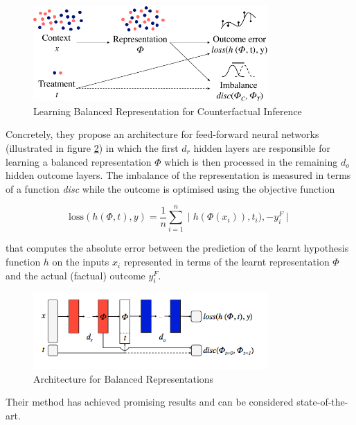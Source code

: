 \begin{figure}[h]
	\centering
	\includegraphics[width=0.8\textwidth]{figures/chapter-2/balanced-representations.png}
	\caption{Learning Balanced Representation for Counterfactual Inference}\label{fig:balanced-representations}
\end{figure}

Concretely, they propose an architecture for feed-forward neural networks (illustrated in figure \ref{fig:balanced-representations-architecture}) in which the first $d_r$ hidden layers are responsible for learning a balanced representation $\Phi$ which is then processed in the remaining $d_o$ hidden outcome layers. 
The imbalance of the representation is measured in terms of a function \emph{disc} while the outcome is optimised using the objective function 

\begin{equation}
	\text{loss}(h(\Phi, t), y) = \frac{1}{n}\sum_{i=1}^{n} \mid h(\Phi(x_i)), t_i), - y_i^{F} \mid
\end{equation}

that computes the absolute error between the prediction of the learnt hypothesis function $h$ on the inputs $x_i$ represented in terms of the learnt representation $\Phi$ and the actual (factual) outcome $y_i^F$. 

\begin{figure}[h]
	\centering
	\includegraphics[width=0.8\textwidth]{figures/chapter-2/sontag-architecture.png}
	\caption{Architecture for Balanced Representations}\label{fig:balanced-representations-architecture}
\end{figure}

Their method has achieved promising results and can be considered state-of-the-art. 


